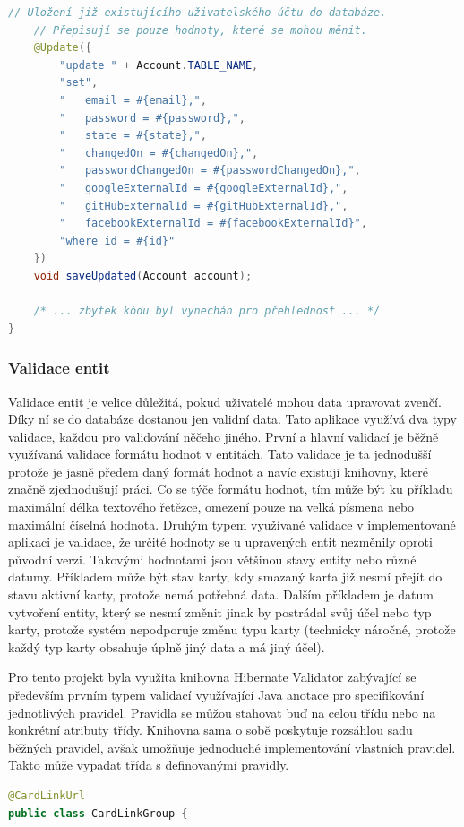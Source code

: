 \begin{itemize}
\begin{itemize}
\begin{lstlisting}[language=Java]
	// Uložení již existujícího uživatelského účtu do databáze.
	// Přepisují se pouze hodnoty, které se mohou měnit.
	@Update({
		"update " + Account.TABLE_NAME,
		"set",
		"   email = #{email},",
		"   password = #{password},",
		"   state = #{state},",
		"   changedOn = #{changedOn},",
		"   passwordChangedOn = #{passwordChangedOn},",
		"   googleExternalId = #{googleExternalId},",
		"   gitHubExternalId = #{gitHubExternalId},",
		"   facebookExternalId = #{facebookExternalId}",
		"where id = #{id}"
	})
	void saveUpdated(Account account);

	/* ... zbytek kódu byl vynechán pro přehlednost ... */
}
		\end{lstlisting}

		\subsubsection{Validace entit}

		Validace entit je velice důležitá, pokud uživatelé mohou data upravovat zvenčí.
		Díky ní se do databáze dostanou jen validní data.
		Tato aplikace využívá dva typy validace, každou pro validování něčeho jiného.
		První a hlavní validací je běžně využívaná validace formátu hodnot v entitách.
		Tato validace je ta jednodušší protože je jasně předem daný formát hodnot a navíc existují knihovny, které
		značně zjednodušují práci.
		Co se týče formátu hodnot, tím může být ku příkladu maximální délka textového řetězce, omezení pouze na velká
		písmena nebo maximální číselná hodnota.
		Druhým typem využívané validace v implementované aplikaci je validace, že určité hodnoty se u upravených entit
		nezměnily oproti původní verzi.
		Takovými hodnotami jsou většinou stavy entity nebo různé datumy.
		Příkladem může být stav karty, kdy smazaný karta již nesmí přejít do stavu aktivní karty, protože nemá potřebná data.
		Dalším příkladem je datum vytvoření entity, který se nesmí změnit jinak by postrádal svůj účel nebo typ karty,
		protože systém nepodporuje změnu typu karty (technicky náročné, protože každý typ karty obsahuje úplně jiný data
		a má jiný účel).

		Pro tento projekt byla využita knihovna Hibernate Validator zabývající se především prvním typem validací
		využívající Java anotace pro specifikování jednotlivých pravidel.
		Pravidla se můžou stahovat buď na celou třídu nebo na konkrétní atributy třídy.
		Knihovna sama o sobě poskytuje rozsáhlou sadu běžných pravidel, avšak umožňuje jednoduché implementování vlastních
		pravidel.
		Takto může vypadat třída s definovanými pravidly.
		\begin{lstlisting}[language=Java]
@CardLinkUrl
public class CardLinkGroup {


\end{lstlisting}
\end{itemize}
\end{itemize}
